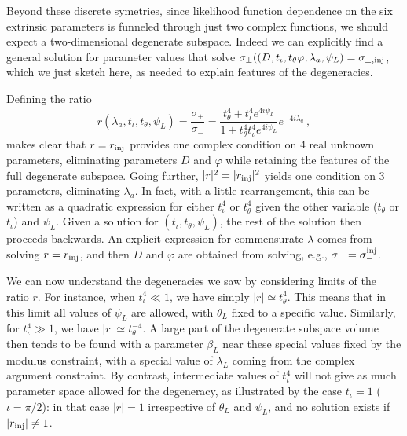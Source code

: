 \documentclass[aps,showpacs,twocolumn,prd,superscriptaddress,nofootinbib]{revtex4-1}
\newcommand{\be}{\begin{equation}}
\newcommand{\ee}{\end{equation}}
\newcommand\psiL{{\psi_{L}}}
\begin{document}
Beyond these discrete symetries, since likelihood function dependence on the six extrinsic parameters is funneled through just two complex functions, we should expect a two-dimensional degenerate subspace.  Indeed we can explicitly find a general solution for parameter values that solve $\sigma_{\pm}((D, t_\iota, t_\theta \varphi, \lambda_a, \psiL)=\sigma_{\pm,{\rm inj}}$, which we just sketch here, as needed to explain features of the degeneracies.

Defining the ratio
\be
	r(\lambda_a, t_\iota, t_\theta, \psiL) = \frac{\sigma_{+}}{\sigma_{-}} = \frac{t_{\theta}^{4}  + t_{\iota}^{4} e^{4 i \psiL}}{1+ t_{\theta}^{4} t_{\iota}^{4} e^{4 i \psiL}} e^{-4i \lambda_{a}}\,,
\ee
makes clear that $r=r_{\rm inj}$ provides one complex condition on 4 real unknown parameters, eliminating parameters $D$ and $\varphi$ while retaining the features of the full degenerate subspace.  Going further, $|r|^2=|r_{\rm inj}|^2$ yields one condition on 3 parameters, eliminating $\lambda_a$. In fact, with a little rearrangement, this can be written as a quadratic expression for either $t_\iota^4$ or $t_\theta^4$ given the other variable ($t_\theta$ or $t_\iota$) and $\psiL$. Given a solution for $(t_\iota,t_\theta,\psi_L)$, the rest of the solution then proceeds backwards. An explicit expression for commensurate $\lambda$ comes from solving $r=r_{\rm inj}$, and then $D$ and $\varphi$ are obtained from solving, e.g., $\sigma_-=\sigma_{-}^{\rm inj}$.

We can now understand the degeneracies we saw by considering limits of the ratio $r$. For instance, when $t_{\iota}^{4} \ll 1$, we have simply $|r| \simeq t_{\theta}^{4}$. This means that in this limit all values of $\psiL$ are allowed, with $\theta_{L}$ fixed to a specific value. Similarly, for $t_{\iota}^{4} \gg 1$, we have $|r| \simeq t_{\theta}^{-4}$. A large part of the degenerate subspace volume then tends to be found with a parameter $\beta_L$ near these special values fixed by the modulus constraint, with a special value of $\lambda_{L}$ coming from the complex argument constraint. By contrast, intermediate values of $t_{\iota}^{4}$ will not give as much parameter space allowed for the degeneracy, as illustrated by the case $t_{\iota} = 1$ ($\iota = \pi/2$): in that case $|r|=1$ irrespective of $\theta_{L}$ and $\psiL$, and no solution exists if $|r_{\rm inj}| \neq 1$.
\end{document}
